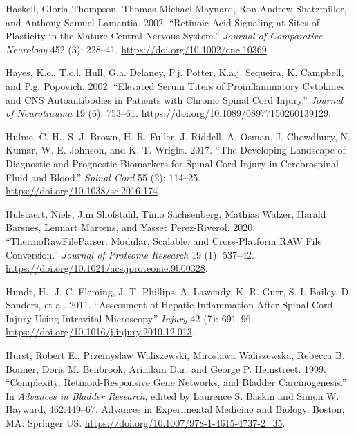 \documentclass[9pt,lineno]{elife}
\newlength{\cslhangindent}
\newlength{\cslentryspacingunit} %
\newenvironment{CSLReferences}[2] %
 {%
  \setlength{\parindent}{0pt}
  \ifodd #1
  \let\oldpar\par
  \def\par{\hangindent=\cslhangindent\oldpar}
  \fi
  \setlength{\parskip}{#2\cslentryspacingunit}
 }%
 {}
\begin{document}
\begin{landscape}
\begin{landscape}
\begin{landscape}
\begin{landscape}
\begin{CSLReferences}{1}{0}
\leavevmode{}%
Haskell, Gloria Thompson, Thomas Michael Maynard, Ron Andrew Shatzmiller, and Anthony-Samuel Lamantia. 2002. {``Retinoic Acid Signaling at Sites of Plasticity in the Mature Central Nervous System.''} \emph{Journal of Comparative Neurology} 452 (3): 228--41. \url{https://doi.org/10.1002/cne.10369}.

\leavevmode{}%
Hayes, K.c., T.c.l. Hull, G.a. Delaney, P.j. Potter, K.a.j. Sequeira, K. Campbell, and P.g. Popovich. 2002. {``Elevated {Serum Titers} of {Proinflammatory Cytokines} and {CNS Autoantibodies} in {Patients} with {Chronic Spinal Cord Injury}.''} \emph{Journal of Neurotrauma} 19 (6): 753--61. \url{https://doi.org/10.1089/08977150260139129}.

\leavevmode{}%
Hulme, C. H., S. J. Brown, H. R. Fuller, J. Riddell, A. Osman, J. Chowdhury, N. Kumar, W. E. Johnson, and K. T. Wright. 2017. {``The Developing Landscape of Diagnostic and Prognostic Biomarkers for Spinal Cord Injury in Cerebrospinal Fluid and Blood.''} \emph{Spinal Cord} 55 (2): 114--25. \url{https://doi.org/10.1038/sc.2016.174}.

\leavevmode{}%
Hulstaert, Niels, Jim Shofstahl, Timo Sachsenberg, Mathias Walzer, Harald Barsnes, Lennart Martens, and Yasset Perez-Riverol. 2020. {``{ThermoRawFileParser}: {Modular}, {Scalable}, and {Cross-Platform RAW File Conversion}.''} \emph{Journal of Proteome Research} 19 (1): 537--42. \url{https://doi.org/10.1021/acs.jproteome.9b00328}.

\leavevmode{}%
Hundt, H., J. C. Fleming, J. T. Phillips, A. Lawendy, K. R. Gurr, S. I. Bailey, D. Sanders, et al. 2011. {``Assessment of Hepatic Inflammation After Spinal Cord Injury Using Intravital Microscopy.''} \emph{Injury} 42 (7): 691--96. \url{https://doi.org/10.1016/j.injury.2010.12.013}.

\leavevmode{}%
Hurst, Robert E., Przemyslaw Waliszewski, Miroslawa Waliszewska, Rebecca B. Bonner, Doris M. Benbrook, Arindam Dar, and George P. Hemstreet. 1999. {``Complexity, {Retinoid-Responsive Gene Networks}, and {Bladder Carcinogenesis}.''} In \emph{Advances in {Bladder Research}}, edited by Laurence S. Baskin and Simon W. Hayward, 462:449--67. Advances in {Experimental Medicine} and {Biology}. {Boston, MA}: {Springer US}. \url{https://doi.org/10.1007/978-1-4615-4737-2_35}.


\end{CSLReferences}
\end{landscape}
\end{landscape}
\end{landscape}
\end{landscape}
\end{document}
